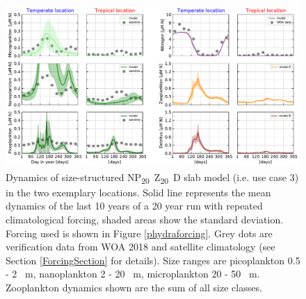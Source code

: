 \documentclass[template.tex]{subfiles}
\begin{document}
\begin{figure}[t]
\includegraphics[width=12cm]{Figures/firstdraft_plots/04_sizestruct_slab.pdf}
\caption{Dynamics of size-structured \unit{NP_{20}Z_{20}D} slab model (i.e. use case 3) in the two exemplary locations. Solid line represents the mean dynamics of the last 10 years of a 20 year run with repeated climatological forcing, shaded areas show the standard deviation. Forcing used is shown in Figure \ref{phydraforcing}. Grey dots are verification data from WOA 2018 and satellite climatology (see Section \ref{ForcingSection} for details). Size ranges are picoplankton 0.5 - 2 \unit{\mu m}, nanoplankton 2 - 20 \unit{\mu m}, microplankton 20 - 50 \unit{\mu m}. Zooplankton dynamics shown are the sum of all size classes.}
\label{Figure:SizeStructuredSlab_results}
\end{figure}

\clearpage

\biblio
\end{document}
